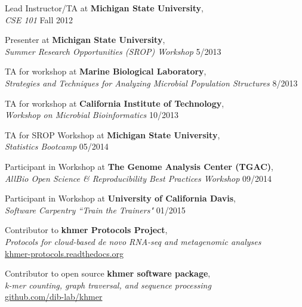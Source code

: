 \documentclass[margin,12pt]{camille_resume}
\begin{document}
\begin{resume}
\begin{list1}
\item[] Lead Instructor/TA at {\bf Michigan State University},\\
{\em CSE 101} \hfill Fall 2012\\

\item[] Presenter at {\bf Michigan State University},\\
{\em Summer Research Opportunities (SROP) Workshop} \hfill 5/2013\\

\item[] TA for workshop at {\bf Marine Biological Laboratory}, \\
{\em Strategies and Techniques for Analyzing Microbial Population Structures} \hfill 8/2013\\

\item[] TA for workshop at {\bf California Institute of Technology}, \\
{\em Workshop on Microbial Bioinformatics}  \hfill 10/2013\\

\item[] TA for SROP Workshop at {\bf Michigan State University}, \\
{\em Statistics Bootcamp} \hfill 05/2014\\

\item[] Participant in Workshop at {\bf The Genome Analysis Center (TGAC)},\\
{\em AllBio Open Science \& Reproducibility Best Practices Workshop} \hfill 09/2014\\

\item[] Participant in Workshop at {\bf University of California Davis},\\
{\em Software Carpentry ``Train the Trainers" } \hfill 01/2015\\

\item[] Contributor to {\bf khmer Protocols Project},\\
{\em Protocols for cloud-based de novo RNA-seq and metagenomic analyses}\\
\hfill \href{https://khmer-protocols.readthedocs.org/}{khmer-protocols.readthedocs.org}\\

\item[] Contributor to open source {\bf khmer software package},\\ 
{\em k-mer counting, graph traversal, and sequence processing}\\
\hfill \href{https://github.com/ged-lab/khmer/}{github.com/dib-lab/khmer}\\


\end{list1}
\end{resume}
\end{document}
